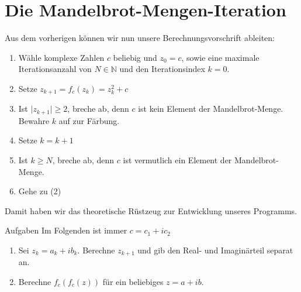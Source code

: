 \section{Die Mandelbrot-Mengen-Iteration}

Aus dem vorherigen können wir nun unsere Berechnungsvorschrift ableiten:

\begin{enumerate}
\item Wähle komplexe Zahlen $c$ beliebig und $z_0=c$, sowie eine maximale Iterationsanzahl von $N\in \mathbb{N}$ und den Iterationsindex $k=0$.
\item Setze $z_{k+1} = f_c(z_k) = z_k^2 +c$
\item Ist $\vert z_{k+1} \vert \ge 2$, breche ab, denn $c$ ist kein Element der Mandelbrot-Menge. Bewahre $k$ auf zur Färbung.
\item Setze $k = k+1$
\item Ist $k\ge N$, breche ab, denn $c$ ist vermutlich ein Element der Mandelbrot-Menge. 
\item Gehe zu (2)
\end{enumerate}

Damit haben wir das theoretische Rüstzeug zur Entwicklung unseres Programms.

\begin{xcb}{Aufgaben}
Im Folgenden ist immer $c=c_1+ic_2$
\begin{enumerate}
\item Sei $z_k = a_k+ib_k$. Berechne $z_{k+1}$ und gib den Real- und Imaginärteil separat an. 
\item Berechne $f_c\left( f_c(z)\right)$ für ein beliebiges $z = a+ib$.
\end{enumerate}

\end{xcb}
